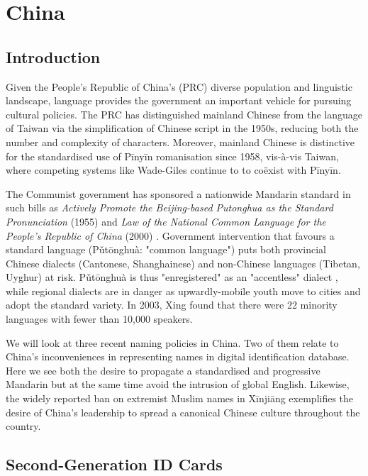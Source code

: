 \section{China}

\subsection{Introduction}

Given the People's Republic of China's (PRC) diverse population and linguistic
landscape, language provides the government an important vehicle for pursuing
cultural policies. The PRC has distinguished mainland Chinese from the language
of Taiwan via the simplification of Chinese script in the 1950s, reducing both
the number and complexity of characters. Moreover, mainland Chinese is
distinctive for the standardised use of Pīnyīn romanisation since 1958,
vis-à-vis Taiwan, where competing systems like Wade-Giles continue to to coëxist
with Pīnyīn. 

The Communist government has sponsored a nationwide Mandarin standard in such
bills as \textit{Actively Promote the Beijing-based Putonghua as the Standard
Pronunciation} (1955) and \textit{Law of the National Common Language for the
People’s Republic of China} (2000) \parencite{dong10}. Government intervention
that favours a standard language (Pǔtōnghuà: "common language") puts both
provincial Chinese dialects (Cantonese, Shanghainese) and non-Chinese languages
(Tibetan, Uyghur) at risk. Pǔtōnghuà is thus "enregistered" as an "accentless"
dialect \parencite{dong10}, while regional dialects are in danger as
upwardly-mobile youth move to cities and adopt the standard variety. In 2003,
Xing found that there were 22 minority languages with fewer than 10,000
speakers.

We will look at three recent naming policies in China. Two of them relate to
China's inconveniences in representing names in digital identification database.
Here we see both the desire to propagate a standardised and progressive Mandarin
but at the same time avoid the intrusion of global English. Likewise, the widely
reported ban on extremist Muslim names in Xīnjiāng exemplifies the desire of
China's leadership to spread a canonical Chinese culture throughout the country.

\subsection{Second-Generation ID Cards}

